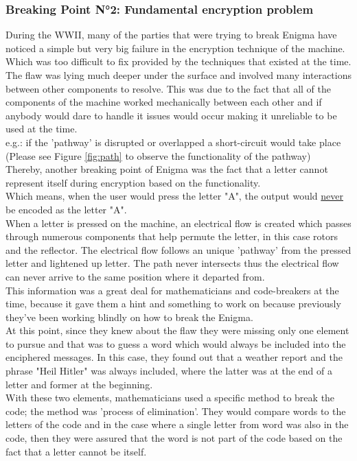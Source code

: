 \documentclass[conference,compsoc]{IEEEtran}
\begin{document}
\subsubsection{Breaking Point N°2: Fundamental encryption problem}
During the WWII, many of the parties that were trying to break Enigma have noticed a simple but very big failure in the encryption technique of the machine. Which was too difficult to fix provided by the techniques that existed at the time. The flaw was lying much deeper under the surface and involved many interactions between other components to resolve.
This was due to the fact that all of the components of the machine worked mechanically between each other and if anybody would dare to handle it issues would occur making it unreliable to be used at the time.\\
e.g.: if the 'pathway' is disrupted or overlapped a short-circuit would take place (Please see Figure \ref{fig:path} to observe the functionality of the pathway)\\
Thereby, another breaking point of Enigma was the fact that a letter cannot represent itself during encryption based on the functionality.\\
Which means, when the user would press the letter "A", the output would \underline{never} be encoded as the letter "A".\\
When a letter is pressed on the machine, an electrical flow is created which passes through numerous components that help permute the letter, in this case rotors and the reflector.
The electrical flow follows an unique 'pathway' from the pressed letter and lightened up letter. The path never intersects thus the electrical flow can never arrive to the same position where it departed from.\\
This information was a great deal for mathematicians and code-breakers at the time, because it gave them a hint and something to work on because previously they've been working blindly on how to break the Enigma.\\
At this point, since they knew about the flaw they were missing only one element to pursue and that was to guess a word which would always be included into the enciphered messages. In this case, they found out that a weather report and the phrase "Heil Hitler" was always included, where the latter was at the end of a letter and former at the beginning.\\
With these two elements, mathematicians used a specific method to break the code; the method was 'process of elimination'. They would compare words to the letters of the code and in the case where a single letter from word was also in the code, then they were assured that the word is not part of the code based on the fact that a letter cannot be itself.\\
\end{document}

